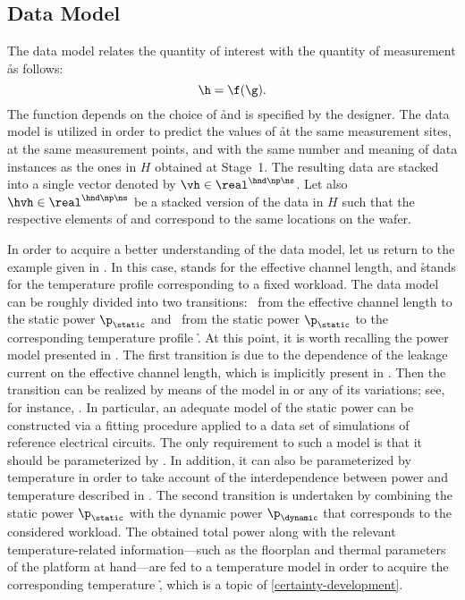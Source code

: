 \subsection{Data Model}

The data model relates the quantity of interest \g with the quantity of
measurement \h as follows:
\[
  \h = \f(\g).
\]
The function \f depends on the choice of \h and is specified by the designer.
The data model is utilized in order to predict the values of \h at the same
measurement sites, at the same measurement points, and with the same number and
meaning of data instances as the ones in $H$ obtained at Stage~1. The resulting
data are stacked into a single vector denoted by $\vh \in \real^{\hnd \np \ns}$.
Let also $\hvh \in \real^{\hnd \np \ns}$ be a stacked version of the data in $H$
such that the respective elements of \vh and \hvh correspond to the same
locations on the wafer.

In order to acquire a better understanding of the data model, let us return to
the example given in . In this case, \g stands for
the effective channel length, and \h stands for the temperature profile \mq
corresponding to a fixed workload. The data model can be roughly divided into
two transitions: \one~from the effective channel length \g to the static power
$\p_\static$ and \two~from the static power $\p_\static$ to the corresponding
temperature profile \h. At this point, it is worth recalling the power model
presented in . The first transition is due to the dependence
of the leakage current on the effective channel length, which is implicitly
present in . Then the transition can be realized by means of
the model in  or any of its variations; see, for instance,
\cite{chandrakasan2000, srivastava2010, juan2012}. In particular, an adequate
model of the static power can be constructed via a fitting procedure applied to
a data set of  simulations of reference electrical circuits. The only
requirement to such a model is that it should be parameterized by \g. In
addition, it can also be parameterized by temperature in order to take account
of the interdependence between power and temperature described in
. The second transition is undertaken by combining the static
power $\p_\static$ with the dynamic power $\p_\dynamic$ that corresponds to the
considered workload. The obtained total power along with the relevant
temperature-related information---such as the floorplan and thermal parameters
of the platform at hand---are fed to a temperature model in order to acquire the
corresponding temperature \h, which is a topic of \cref{certainty-development}.

